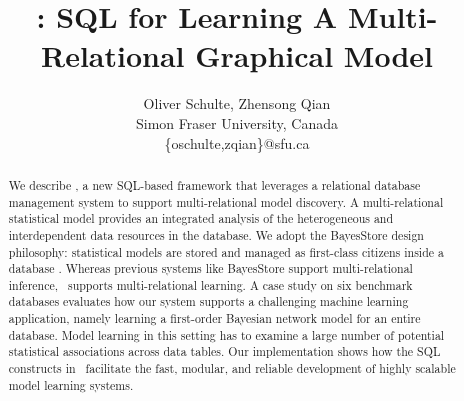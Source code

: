 \documentclass{IEEEtran}
\begin{document}
\title{\FB: SQL for Learning A  Multi-Relational Graphical Model}
\author{
Oliver Schulte, Zhensong Qian\\
 Simon Fraser University, Canada\\
\{oschulte,zqian\}@sfu.ca
}

\maketitle  
\begin{abstract} 
We describe \FB, a new SQL-based framework that leverages a relational database management system to support multi-relational model discovery. A multi-relational statistical model provides an integrated analysis of the heterogeneous and interdependent data resources in the database.  We adopt the BayesStore design philosophy: statistical models are stored and managed as first-class citizens inside a database \cite{Wang2008}. Whereas previous systems like BayesStore support multi-relational inference, \FB\ supports multi-relational learning. 
A case study on six benchmark databases evaluates how our system supports a challenging machine learning application, namely learning a first-order Bayesian network model for an entire database. Model learning in this setting has to examine a large number of potential statistical associations across data tables. Our implementation shows how the SQL constructs in \FB\ facilitate the fast, modular, and reliable development of highly scalable model learning systems.
\end{abstract}
%
%
%
\end{document}
